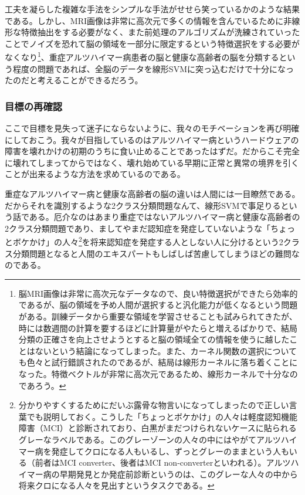 工夫を凝らした複雑な手法をシンプルな手法がせせら笑っているかのような結果である。しかし、MRI画像は非常に高次元で多くの情報を含んでいるために非線形な特徴抽出をする必要がなく、また前処理のアルゴリズムが洗練されていったことでノイズを恐れて脳の領域を一部分に限定するという特徴選択をする必要がなくなり\footnote{脳MRI画像は非常に高次元なデータなので、良い特徴選択ができたら効率的であるが、脳の領域を予め人間が選択すると汎化能力が低くなるという問題がある。訓練データから重要な領域を学習させることも試みられてきたが、時には数週間の計算を要するほどに計算量がやたらと増えるばかりで、結局分類の正確さを向上させようとすると脳の領域全ての情報を使うに越したことはないという結論になってしまった。また、カーネル関数の選択についても色々と試行錯誤されたのであるが、結局は線形カーネルに落ち着くことになった。特徴ベクトルが非常に高次元であるため、線形カーネルで十分なのであろう。}、重症アルツハイマー病患者の脳と健康な高齢者の脳を分類するという程度の問題であれば、全脳のデータを線形SVMに突っ込むだけで十分になったのだと考えることができるだろう。

\subsubsection{目標の再確認}
ここで目標を見失って迷子にならないように、我々のモチベーションを再び明確にしておこう。我々が目指しているのはアルツハイマー病というハードウェアの障害を壊れかけの初期のうちに食い止めることであったはずだ。だからこそ完全に壊れてしまってからではなく、壊れ始めている早期に正常と異常の境界を引くことが出来るような方法を求めているのである。

重症なアルツハイマー病と健康な高齢者の脳の違いは人間には一目瞭然である。だからそれを識別するような2クラス分類問題なんて、線形SVMで事足りるという話である。厄介なのはあまり重症ではないアルツハイマー病と健康な高齢者の2クラス分類問題であり、ましてやまだ認知症を発症していないような「ちょっとボケかけ」の人々\footnote{分かりやすくするためにだいぶ露骨な物言いになってしまったので正しい言葉でも説明しておく。こうした「ちょっとボケかけ」の人々は軽度認知機能障害（MCI）と診断されており、白黒がまだつけられないケースに貼られるグレーなラベルである。このグレーゾーンの人々の中にはやがてアルツハイマー病を発症してクロになる人もいるし、ずっとグレーのままという人もいる（前者はMCI converter、後者はMCI non-converterといわれる）。アルツハイマー病の早期発見とか発症前診断というのは、このグレーな人々の中から将来クロになる人々を見出すというタスクである。}を将来認知症を発症する人としない人に分けるという2クラス分類問題となると人間のエキスパートもしばしば苦慮してしまうほどの難問なのである。

